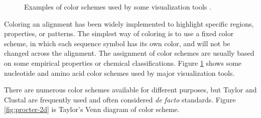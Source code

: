 \begin{figure}[hbt]
\centering
{}
\caption[Some Nucleotide and Amino Acid Color Schemes]{Examples of color schemes used by some visualization tools \cite{Procter2010aa}.}\label{fig:procter-2bc}
\end{figure}

Coloring an alignment has been widely implemented to highlight specific regions, properties, or patterns. The simplest way of coloring is to use a fixed color scheme, in which each sequence symbol has its own color, and will not be changed across the alignment. The assignment of color schemes are usually based on some empirical properties or chemical classifications. Figure \ref{fig:procter-2bc} shows some nucleotide and amino acid color schemes used by major visualization tools.

There are numerous color schemes available for different purposes, but Taylor \cite{LIN2002361} and Clustal \cite{Thompsonaa} are frequently used and often considered \emph{de facto} standards. Figure \ref{fig:procter-2d} is Taylor's Venn diagram of color scheme.

